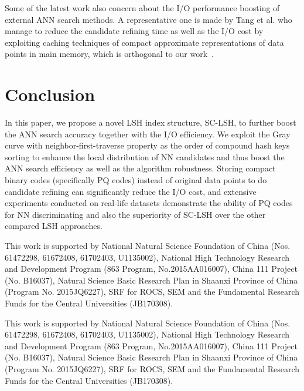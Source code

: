 \documentclass[twocolumn]{svjour3}          %
\begin{document}
Some of the latest work also concern about the I/O performance boosting of external ANN search methods. A representative one is made by Tang et al. who manage to reduce the candidate refining time as well as the I/O cost by exploiting caching techniques of compact approximate representations of data points in main memory, which is orthogonal to our work~\cite{Tang2016Exploit}.



\section{Conclusion}\label{sec:conclusion}
In this paper, we propose a novel LSH index structure, SC-LSH, to further boost the ANN search accuracy together with the I/O efficiency. We exploit the Gray curve with neighbor-first-traverse property as the order of compound hash keys sorting to enhance the local distribution of NN candidates and thus boost the ANN search efficiency as well as the algorithm robustness. Storing compact binary codes (specifically PQ codes) instead of original data points to do candidate refining can significantly reduce the I/O cost, and extensive experiments conducted on real-life datasets demonstrate the ability of PQ codes for NN discriminating and also the superiority of SC-LSH over the other compared LSH approaches.


\begin{acknowledgements}
This work is supported by National Natural Science Foundation of China (Nos. 61472298, 61672408, 61702403, U1135002), National High Technology Research and Development Program (863 Program, No.2015AA016007), China 111 Project (No. B16037), Natural Science Basic Research Plan in Shaanxi Province of China (Program No. 2015JQ6227), SRF for ROCS, SEM and the Fundamental Research Funds for the Central Universities (JB170308).
\end{acknowledgements}

\begin{acknowledgements}
	This work is supported by National Natural Science Foundation of China (Nos. 61472298, 61672408, 61702403, U1135002), National High Technology Research and Development Program (863 Program, No.2015AA016007), China 111 Project (No. B16037), Natural Science Basic Research Plan in Shaanxi Province of China (Program No. 2015JQ6227), SRF for ROCS, SEM and the Fundamental Research Funds for the Central Universities (JB170308).
\end{acknowledgements}

 
\end{document}

